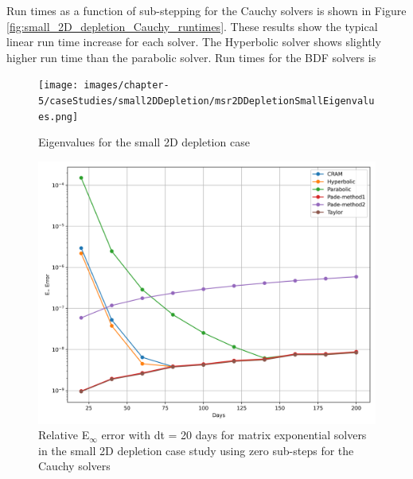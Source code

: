 Run times as a function of sub-stepping for the Cauchy solvers is shown in Figure \ref{fig:small_2D_depletion_Cauchy_runtimes}. These results show the typical linear run time increase for each solver. The Hyperbolic solver shows slightly higher run time than the parabolic solver. Run times for the BDF solvers is 

\clearpage

\begin{figure}[p]
    \centering
    \texttt{[image: images/chapter-5/caseStudies/small2DDepletion/msr2DDepletionSmallEigenvalues.png]}
    \caption{Eigenvalues for the small 2D depletion case}
    \label{fig:small_2D_depletion_eigenvalues}
\end{figure}

\clearpage

\begin{figure}[p]
    \centering
    \includegraphics[width=5in]{images/chapter-5/caseStudies/small2DDepletion/msrSmall2DDepletionEinfErrorerrorSteps0.png}
    \caption{Relative E$_{\infty}$ error with dt = 20 days for matrix exponential solvers in the small 2D depletion case study using zero sub-steps for the Cauchy solvers}
    \label{fig:small_2D_depletion_Einf_steps0}
\end{figure}

\clearpage


